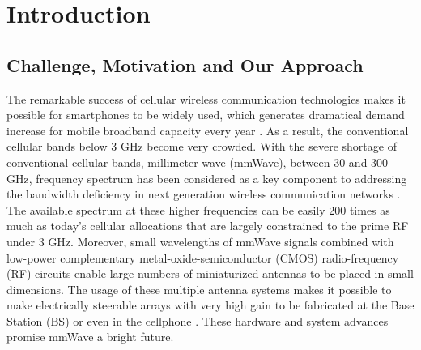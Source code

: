 \chapter{Introduction}\label{ch:Intro}
\section{Challenge, Motivation and Our Approach}
\label{sec:1}
\par The remarkable success of cellular wireless communication technologies makes it possible for smartphones to be widely used, which generates dramatical demand increase for mobile broadband capacity every year \cite{index2013global, cerwall2011ericsson, pujol2011mobile}. As a result, the conventional cellular bands below 3 GHz become very crowded. With the severe shortage of conventional cellular bands, millimeter wave (mmWave), between $30$ and $300$ GHz, frequency spectrum has been considered as a key component to addressing the bandwidth deficiency in next generation wireless communication networks \cite{khan2011mmwave, pi2011introduction, rappaport2011state, pietraski2012millimeter, rangan2014millimeter}. The available spectrum at these higher frequencies can be easily 200 times as much as today's cellular allocations that are largely constrained to the prime RF under 3 GHz. Moreover, small wavelengths of mmWave signals combined with low-power complementary metal-oxide-semiconductor (CMOS) radio-frequency (RF) circuits enable large numbers of miniaturized antennas to be placed in small dimensions. The usage of these multiple antenna systems makes it possible to make electrically steerable arrays with very high gain to be fabricated at the Base Station (BS) or even in the cellphone \cite{doan2004design, zhang2009antenna, gutierrez2009chip, rajagopal2011antenna}. These hardware and system advances promise mmWave a bright future.
